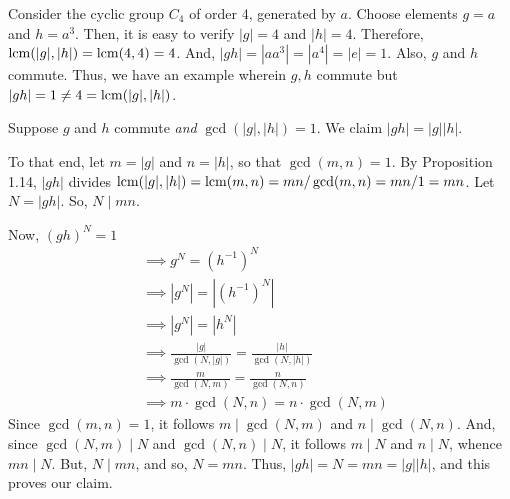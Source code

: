 \begin{xca}
Consider the cyclic group $C_4$ of order $4$, generated by $a$. Choose elements
$g = a$ and $h = a^3$. Then, it is easy to verify $|g| = 4$ and $|h| = 4$.
Therefore, $\operatorname{lcm}(|g|, |h|) = \operatorname{lcm}(4, 4) = 4$. And, $|gh| = |aa^3| = |a^4| =
|e| = 1$. Also, $g$ and $h$ commute. Thus, we have an example wherein $g, h$
commute but $|gh| = 1 \ne 4 = \operatorname{lcm}(|g|, |h|)$.
\end{xca}

\begin{xca}
Suppose $g$ and $h$ commute \emph{and} $\gcd(|g|, |h|) = 1$. We claim $|gh| =
|g||h|$.

To that end, let $m = |g|$ and $n = |h|$, so that $\gcd(m, n) = 1$. By
Proposition 1.14, $|gh|$ divides $\operatorname{lcm}(|g|, |h|) = \operatorname{lcm}(m, n) = mn/\gcd(m, n) =
mn/1 = mn$. Let $N = |gh|$. So, $N \mid mn$.

Now, $(gh)^N = 1$
\begin{align*}
    &\implies g^N = (h^{-1})^N \\
    &\implies |g^N| = |(h^{-1})^N| \\
    &\implies |g^N| = |h^N| \\
    &\implies \frac{|g|}{\gcd(N, |g|)} = \frac{|h|}{\gcd(N, |h|)} \\
    &\implies \frac{m}{\gcd(N, m)} = \frac{n}{\gcd(N, n)} \\
    &\implies m \cdot \gcd(N, n) = n \cdot \gcd(N, m)
\end{align*}
Since $\gcd(m, n) = 1$, it follows $m \mid \gcd(N, m)$ and $n \mid \gcd(N, n)$.
And, since $\gcd(N, m) \mid N$ and $ \gcd(N, n) \mid N$, it follows $m \mid N$
and $n \mid N$, whence $mn \mid N$. But, $N \mid mn$, and so, $N = mn$. Thus,
$|gh| = N = mn = |g||h|$, and this proves our claim.
\end{xca}

\begin{xca}
\end{xca}

